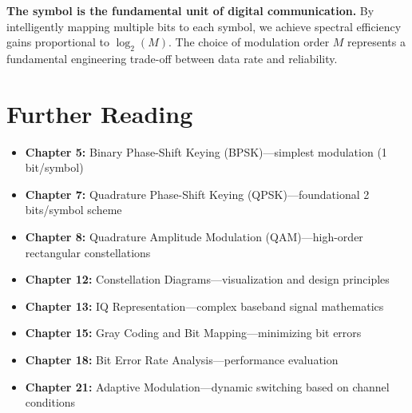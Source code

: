 \begin{keyconcept}
\textbf{The symbol is the fundamental unit of digital communication.} By intelligently mapping multiple bits to each symbol, we achieve spectral efficiency gains proportional to $\log_2(M)$. The choice of modulation order $M$ represents a fundamental engineering trade-off between data rate and reliability.
\end{keyconcept}

\section{Further Reading}

\begin{itemize}
\item \textbf{Chapter 5:} Binary Phase-Shift Keying (BPSK)---simplest modulation (1 bit/symbol)
\item \textbf{Chapter 7:} Quadrature Phase-Shift Keying (QPSK)---foundational 2 bits/symbol scheme
\item \textbf{Chapter 8:} Quadrature Amplitude Modulation (QAM)---high-order rectangular constellations
\item \textbf{Chapter 12:} Constellation Diagrams---visualization and design principles
\item \textbf{Chapter 13:} IQ Representation---complex baseband signal mathematics
\item \textbf{Chapter 15:} Gray Coding and Bit Mapping---minimizing bit errors
\item \textbf{Chapter 18:} Bit Error Rate Analysis---performance evaluation
\item \textbf{Chapter 21:} Adaptive Modulation---dynamic switching based on channel conditions
\end{itemize}
